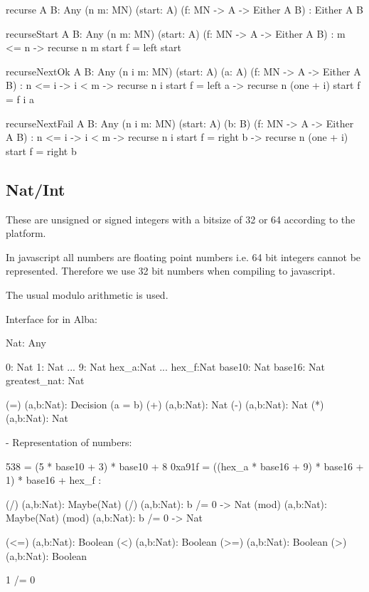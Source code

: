 \begin{alba}
    recurse
        {A B: Any}
        (n m: MN) (start: A) (f: MN -> A -> Either A B)
        : Either A B

    recurseStart
        {A B: Any}
        (n m: MN)
        (start: A)
        (f: MN -> A -> Either A B)
        : m <= n
          -> recurse n m start f = left start

    recurseNextOk
        {A B: Any}
        (n i m: MN)
        (start: A)
        (a: A)
        (f: MN -> A -> Either A B)
        : n <= i
          -> i < m
          -> recurse n i start f = left a
          -> recurse n (one + i) start f = f i a

    recurseNextFail
        {A B: Any}
        (n i m: MN)
        (start: A)
        (b: B)
        (f: MN -> A -> Either A B)
        : n <= i
          -> i < m
          -> recurse n i start f = right b
          -> recurse n (one + i) start f = right b
\end{alba}





\subsection{Nat/Int}

These are unsigned or signed integers with a bitsize of 32 or 64 according to
the platform.

In javascript all numbers are floating point numbers i.e. 64 bit
integers cannot be represented. Therefore we use 32 bit numbers when compiling
to javascript.

The usual modulo arithmetic is used.

Interface for  in Alba:
%
\begin{alba}
    Nat: Any

    0: Nat
    1: Nat
    ...
    9: Nat
    hex_a:Nat
    ...
    hex_f:Nat
    base10:   Nat
    base16:   Nat
    greatest_nat: Nat

    (=) (a,b:Nat): Decision (a = b)
    (+) (a,b:Nat): Nat
    (-) (a,b:Nat): Nat
    (*) (a,b:Nat): Nat

    {- Representation of numbers:

      538    =  (5 * base10 + 3) * base10 + 8
      0xa91f =  ((hex_a * base16 + 9) * base16 + 1) * base16 + hex_f
    :}

    (/) (a,b:Nat): Maybe(Nat)
    (/) (a,b:Nat): b /= 0 -> Nat
    (mod) (a,b:Nat): Maybe(Nat)
    (mod) (a,b:Nat): b /= 0 -> Nat

    (<=) (a,b:Nat): Boolean
    (<)  (a,b:Nat): Boolean
    (>=) (a,b:Nat): Boolean
    (>)  (a,b:Nat): Boolean

    1 /= 0
\end{alba}


